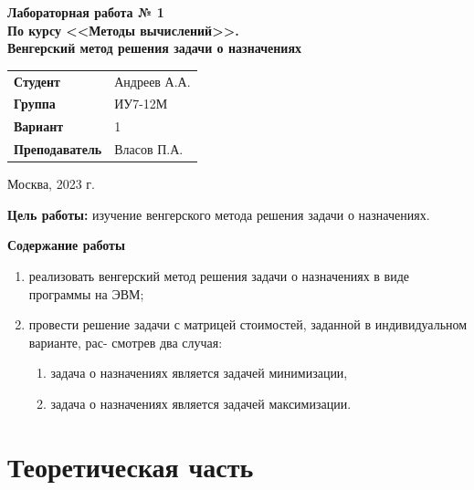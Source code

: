 \documentclass[a4paper,14pt]{article}
\begin{document}
\begin{titlepage}
    \vspace{4cm}

     \begin{center}
        \textbf{Лабораторная работа № 1} \\
        \textbf{По курсу <<Методы вычислений>>.} \\
        \vspace{0.5cm}
        \textbf{Венгерский метод решения задачи о назначениях}
    \end{center}

    \vspace{3cm}

    \begin{flushleft}
        \begin{tabular}{ll}
            \textbf{Студент} & Андреев А.А. \\
            \textbf{Группа} & ИУ7-12М \\
             \textbf{Вариант} & 1 \\
            \textbf{Преподаватель} & Власов П.А. \\
        \end{tabular}
    \end{flushleft}

    \vspace{7cm}

   \begin{center}
        Москва, 2023 г.
    \end{center}

\end{titlepage}


\textbf{Цель работы: } изучение венгерского метода решения задачи о назначениях.

\textbf{Содержание работы}
\begin{enumerate}
\item реализовать венгерский метод решения задачи о назначениях в виде программы на ЭВМ;
\item провести решение задачи с матрицей стоимостей, заданной в индивидуальном варианте, рас-
смотрев два случая:
\begin{enumerate}
\item задача о назначениях является задачей минимизации,
\item задача о назначениях является задачей максимизации.
\end{enumerate}
\end{enumerate}

\section{Теоретическая часть}
\end{document}
